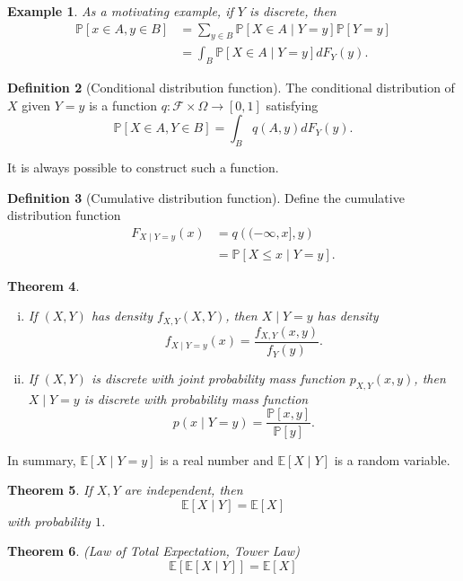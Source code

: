 \documentclass{tufte-handout}
\newcommand*\E{\mathbb{E}}
\renewcommand{\P}{\mathbb{P}}
\newtheorem{thm}{Theorem}[subsection]
\newtheorem{ex}[thm]{Example}
\theoremstyle{definition}
\newtheorem{defn}[thm]{Definition}
\begin{document}
\begin{ex}
	As a motivating example, if $Y$ is discrete, then
	\begin{align*}
		\P\left[x \in A, y \in B\right] &= \sum\limits_{y\in B}^{} \P\left[X \in A \mid Y = y\right] \P\left[Y = y\right]  \\
										&= \int_{B}^{} \P\left[X \in A \mid Y = y\right] dF_Y(y)
	.\end{align*}
\end{ex}

\begin{defn}[Conditional distribution function]
	The conditional distribution of $X$ given $Y = y$ is a function $q: \mathscr{F} \times \Omega \to[0,1]$ satisfying \[
		\P\left[X \in A, Y \in B\right] = \int_{B}^{} q(A,y) dF_Y(y) 
	.\] 
\end{defn}

It is always possible to construct such a function.

\begin{defn}[Cumulative distribution function]
	Define the cumulative distribution function
	\begin{align*}
		F_{X \mid Y = y}(x) &= q\left( (-\infty,x],y \right) \\
							&= \P\left[X \le x \mid Y =y\right] 
	.\end{align*}
\end{defn}

\begin{thm}
	\begin{enumerate}[(i)]
		\item If $(X,Y)$ has density $f_{X,Y}(X,Y)$, then $X \mid Y = y$ has density \[
			f_{X \mid Y = y}(x) = \frac{f_{X,Y}(x,y)}{f_Y(y)}
		.\] 
		\item If $(X,Y)$ is discrete with joint probability mass function $p_{X,Y}(x,y)$, then $X \mid Y =y$ is discrete with probability mass function \[
			p(x \mid Y = y) = \frac{\P\left[x,y\right] }{\P\left[y\right] }
		.\] 
	\end{enumerate}
\end{thm}

In summary, $\E\left[X \mid Y= y\right]$ is a real number and $\E\left[X \mid Y\right] $ is a random variable.

\begin{thm}
	If $X,Y$ are independent, then \[
		\E\left[X \mid Y\right] = \E\left[X\right] 
	\] with probability $1$.
\end{thm}

\begin{thm}
	(Law of Total Expectation, Tower Law) \[\E\left[\E\left[X \mid Y\right] \right] = \E\left[X\right] \]
\end{thm}
\end{document}
